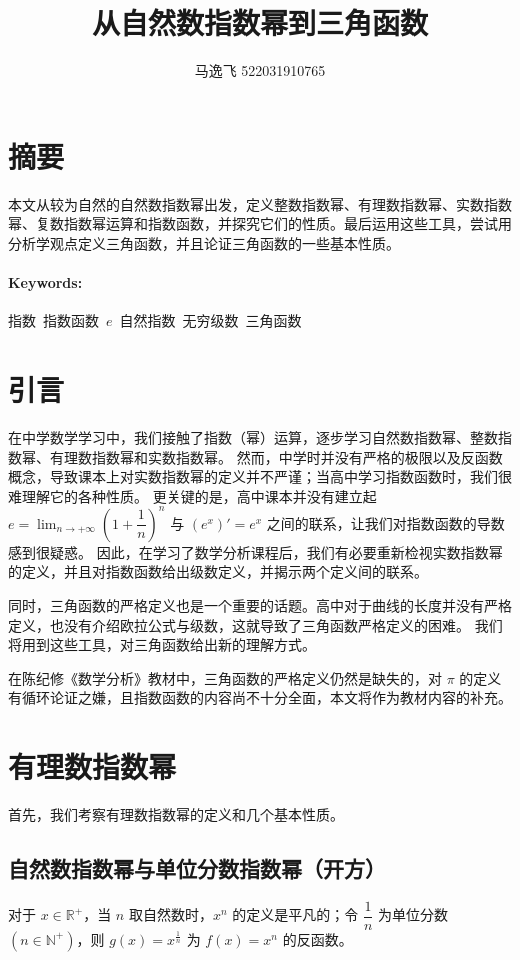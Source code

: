 \documentclass[UTF8,12pt]{ctexart}
\title{从自然数指数幂到三角函数}                   %
\author{马逸飞 522031910765}
\begin{document}
    \maketitle                                  %
\tableofcontents                               %

\section{摘要}
    本文从较为自然的自然数指数幂出发，定义整数指数幂、有理数指数幂、实数指数幂、复数指数幂运算和指数函数，并探究它们的性质。最后运用这些工具，尝试用分析学观点定义三角函数，并且论证三角函数的一些基本性质。\\
    \paragraph{Keywords: } 指数\ 指数函数\ $e$\ 自然指数\ 无穷级数\ 三角函数

\section{引言}
    在中学数学学习中，我们接触了指数（幂）运算，逐步学习自然数指数幂、整数指数幂、有理数指数幂和实数指数幂。
    然而，中学时并没有严格的极限以及反函数概念，导致课本上对实数指数幂的定义并不严谨；当高中学习指数函数时，我们很难理解它的各种性质。
    更关键的是，高中课本并没有建立起 $e = \lim _ {n \to +\infty} (1 + \dfrac{1}{n})^n$ 与 $(e^x)' = e^x$ 之间的联系，让我们对指数函数的导数感到很疑惑。
    因此，在学习了数学分析课程后，我们有必要重新检视实数指数幂的定义，并且对指数函数给出级数定义，并揭示两个定义间的联系。
    
    同时，三角函数的严格定义也是一个重要的话题。高中对于曲线的长度并没有严格定义，也没有介绍欧拉公式与级数，这就导致了三角函数严格定义的困难。
    我们将用到这些工具，对三角函数给出新的理解方式。

    在陈纪修《数学分析》教材中，三角函数的严格定义仍然是缺失的，对 $\pi$ 的定义有循环论证之嫌，且指数函数的内容尚不十分全面，本文将作为教材内容的补充。

\section{有理数指数幂}
    首先，我们考察有理数指数幂的定义和几个基本性质。
    \subsection{自然数指数幂与单位分数指数幂（开方）}
        对于 $x \in \mathbb{R}^+$，当 $n$ 取自然数时，$x^n$ 的定义是平凡的；令 $\dfrac 1 n$ 为单位分数 $(n \in \mathbb N^+)$，则 $g(x) = x^{\frac 1 n}$ 为 $f(x) = x^n$ 的反函数。
\end{document}
